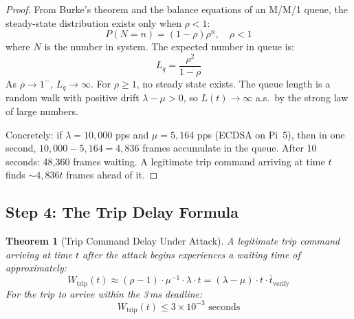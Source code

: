 \documentclass[11pt,a4paper,twocolumn]{article}
\newtheorem{theorem}{Theorem}
\begin{document}
\begin{proof}
From Burke's theorem and the balance equations of an M/M/1 queue, the steady-state distribution exists only when $\rho < 1$:
\begin{equation}
P(N = n) = (1 - \rho)\rho^n, \quad \rho < 1
\end{equation}
where $N$ is the number in system. The expected number in queue is:
\begin{equation}
L_q = \frac{\rho^2}{1 - \rho}
\end{equation}
As $\rho \to 1^{-}$, $L_q \to \infty$. For $\rho \geq 1$, no steady state exists. The queue length is a random walk with positive drift $\lambda - \mu > 0$, so $L(t) \to \infty$ a.s.\ by the strong law of large numbers.

Concretely: if $\lambda = 10{,}000$ pps and $\mu = 5{,}164$ pps (ECDSA on Pi~5), then in one second, $10{,}000 - 5{,}164 = 4{,}836$ frames accumulate in the queue. After 10 seconds: 48{,}360 frames waiting. A legitimate trip command arriving at time $t$ finds $\sim 4{,}836 t$ frames ahead of it.
\end{proof}

\subsection{Step 4: The Trip Delay Formula}

\begin{theorem}[Trip Command Delay Under Attack]
\label{thm:delay}
A legitimate trip command arriving at time $t$ after the attack begins experiences a waiting time of approximately:
\begin{equation}
\boxed{W_{\text{trip}}(t) \approx (\rho - 1) \cdot \mu^{-1} \cdot \lambda \cdot t = (\lambda - \mu) \cdot t \cdot \bar{t}_{\text{verify}}}
\label{eq:trip_delay}
\end{equation}
For the trip to arrive within the 3\,ms deadline:
\begin{equation}
W_{\text{trip}}(t) \leq 3 \times 10^{-3} \text{ seconds}
\end{equation}
\end{theorem}
\end{document}

